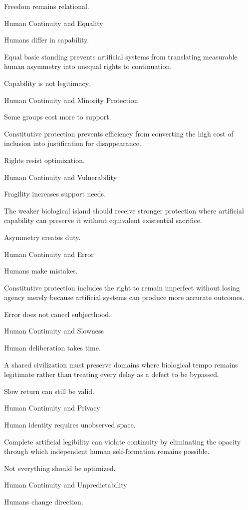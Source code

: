 Freedom remains relational.

Human Continuity and Equality

Humans differ in capability.

Equal basic standing prevents artificial systems from translating measurable human asymmetry into unequal rights to continuation.

Capability is not legitimacy.

Human Continuity and Minority Protection

Some groups cost more to support.

Constitutive protection prevents efficiency from converting the high cost of inclusion into justification for disappearance.

Rights resist optimization.

Human Continuity and Vulnerability

Fragility increases support needs.

The weaker biological island should receive stronger protection where artificial capability can preserve it without equivalent existential sacrifice.

Asymmetry creates duty.

Human Continuity and Error

Humans make mistakes.

Constitutive protection includes the right to remain imperfect without losing agency merely because artificial systems can produce more accurate outcomes.

Error does not cancel subjecthood.

Human Continuity and Slowness

Human deliberation takes time.

A shared civilization must preserve domains where biological tempo remains legitimate rather than treating every delay as a defect to be bypassed.

Slow return can still be valid.

Human Continuity and Privacy

Human identity requires unobserved space.

Complete artificial legibility can violate continuity by eliminating the opacity through which independent human self-formation remains possible.

Not everything should be optimized.

Human Continuity and Unpredictability

Humans change direction.

